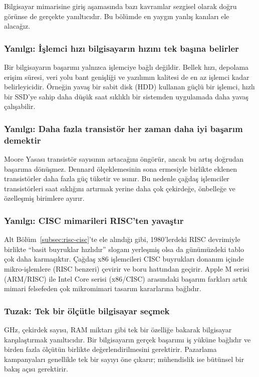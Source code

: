 Bilgisayar mimarisine giriş aşamasında bazı kavramlar sezgisel olarak doğru görünse de gerçekte yanıltıcıdır. Bu bölümde en yaygın yanlış kanıları ele alacağız.

\subsubsection*{Yanılgı: İşlemci hızı bilgisayarın hızını tek başına belirler}
Bir bilgisayarın başarımı yalnızca işlemciye bağlı değildir. Bellek hızı, depolama erişim süresi, veri yolu bant genişliği ve yazılımın kalitesi de en az işlemci kadar belirleyicidir. Örneğin yavaş bir sabit disk (HDD) kullanan güçlü bir işlemci, hızlı bir SSD'ye sahip daha düşük saat sıklıklı bir sistemden uygulamada daha yavaş çalışabilir.

\subsubsection*{Yanılgı: Daha fazla transistör her zaman daha iyi başarım demektir}
Moore Yasası transistör sayısının artacağını öngörür, ancak bu artış doğrudan başarıma dönüşmez. Dennard ölçeklemesinin sona ermesiyle birlikte eklenen transistörler daha fazla güç tüketir ve ısınır. Bu nedenle çağdaş işlemciler transistörleri saat sıklığını artırmak yerine daha çok çekirdeğe, önbelleğe ve özelleşmiş birimlere ayırır.

\subsubsection*{Yanılgı: CISC mimarileri RISC'ten yavaştır}
Alt Bölüm~\ref{subsec:risc-cisc}'te ele alındığı gibi, 1980'lerdeki RISC devrimiyle birlikte ``basit buyruklar hızlıdır'' sloganı yerleşmiş olsa da günümüzdeki tablo çok daha karmaşıktır. Çağdaş x86 işlemcileri CISC buyrukları donanım içinde mikro-işlemlere (RISC benzeri) çevirir ve boru hattından geçirir. Apple M serisi (ARM/RISC) ile Intel Core serisi (x86/CISC) arasındaki başarım farkları artık mimari felsefeden çok mikromimari tasarım kararlarına bağlıdır.

\subsubsection*{Tuzak: Tek bir ölçütle bilgisayar seçmek}
GHz, çekirdek sayısı, RAM miktarı gibi tek bir özelliğe bakarak bilgisayar karşılaştırmak yanıltıcıdır. Bir bilgisayarın gerçek başarımı iş yüküne bağlıdır ve birden fazla ölçütün birlikte değerlendirilmesini gerektirir. Pazarlama kampanyaları genellikle tek bir sayıyı öne çıkarır; mühendislik ise bütünsel bir bakış açısı gerektirir.

